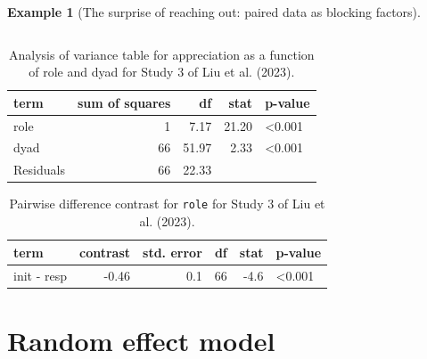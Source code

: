 \documentclass[
  11pt,
  letterpaper,
]{scrbook}
\theoremstyle{definition}
\theoremstyle{definition}
\newtheorem{example}{Example}[chapter]
\theoremstyle{remark}
\begin{document}
\begin{example}[The surprise of reaching out: paired data as blocking
factors]
\begin{longtable}[]{@{}ccccc@{}}
\end{longtable}

\begin{longtable}[]{@{}lrrrl@{}}

\caption{\label{tbl-LRMMS3-anovatab}Analysis of variance table for
appreciation as a function of role and dyad for Study 3 of Liu et al.
(2023).}

\tabularnewline

\toprule\noalign{}
term & sum of squares & df & stat & p-value \\
\midrule\noalign{}
\endhead
\bottomrule\noalign{}
\endlastfoot
role & 1 & 7.17 & 21.20 & \textless0.001 \\
dyad & 66 & 51.97 & 2.33 & \textless0.001 \\
Residuals & 66 & 22.33 & & \\

\end{longtable}

\begin{longtable}[]{@{}lrrrrl@{}}

\caption{\label{tbl-LRMMS3-emmeans}Pairwise difference contrast for
\texttt{role} for Study 3 of Liu et al. (2023).}

\tabularnewline

\toprule\noalign{}
term & contrast & std. error & df & stat & p-value \\
\midrule\noalign{}
\endhead
\bottomrule\noalign{}
\endlastfoot
init - resp & -0.46 & 0.1 & 66 & -4.6 & \textless0.001 \\

\end{longtable}

\end{example}

\section{Random effect model}\label{random-effect-model}
\end{document}
